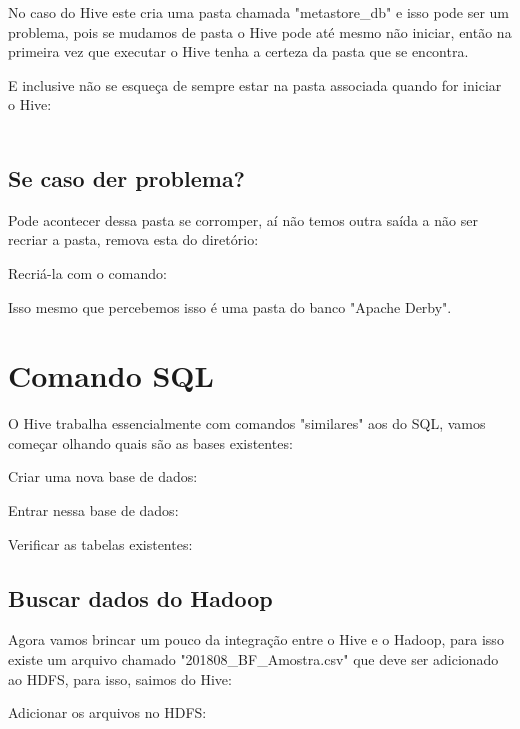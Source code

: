 \documentclass[a4paper,11pt]{article}
\begin{document}
No caso do Hive este cria uma pasta chamada "metastore\_db" e isso pode ser um problema, pois se mudamos de pasta o Hive pode até mesmo não iniciar, então na primeira vez que executar o Hive tenha a certeza da pasta que se encontra.

E inclusive não se esqueça de sempre estar na pasta associada quando for iniciar o Hive: \\
 \\

\subsection{Se caso der problema?}
Pode acontecer dessa pasta se corromper, aí não temos outra saída a não ser recriar a pasta, remova esta do diretório: \\

Recriá-la com o comando: \\

Isso mesmo que percebemos isso é uma pasta do banco "Apache Derby".

\section{Comando SQL}
O Hive trabalha essencialmente com comandos "similares" aos do SQL, vamos começar olhando quais são as bases existentes: \\

Criar uma nova base de dados: \\

Entrar nessa base de dados: \\

Verificar as tabelas existentes: \\

\subsection{Buscar dados do Hadoop}
Agora vamos brincar um pouco da integração entre o Hive e o Hadoop, para isso existe um arquivo chamado "201808\_BF\_Amostra.csv" que deve ser adicionado ao HDFS, para isso, saimos do Hive: \\

Adicionar os arquivos no HDFS: \\
\end{document}
